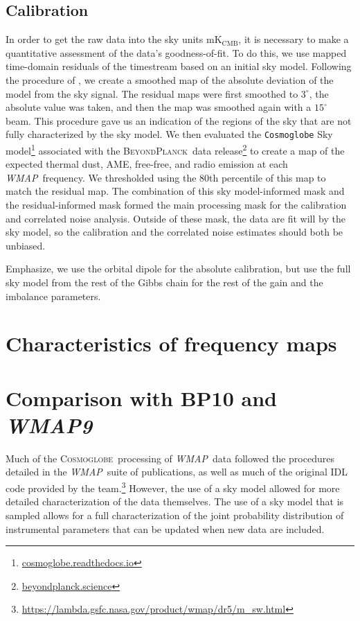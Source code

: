 \documentclass[twocolumn]{../../common/aa}
\def\WMAP{\emph{WMAP}}
\newcommand{\BP}{\textsc{BeyondPlanck}}
\newcommand{\Cosmoglobe}{\textsc{Cosmoglobe}}
\begin{document}

\subsection{Calibration}

In order to get the raw data into the sky units $\mathrm{mK_{CMB}}$, it is necessary to make a quantitative assessment of the data's goodness-of-fit. To do this, we use mapped time-domain residuals of the timestream based on an initial sky model. Following the procedure of \citet{bp06}, we create a smoothed map of the absolute deviation of the model from the sky signal. The residual maps were first smoothed to $3^\circ$, the absolute value was taken, and then the map was smoothed again with a $15^\circ$ beam. This procedure gave us an indication of the regions of the sky that are not fully characterized by the sky model. We then evaluated the \texttt{Cosmoglobe} Sky model\footnote{\url{cosmoglobe.readthedocs.io}} associated with the \BP\ data release\footnote{\url{beyondplanck.science}} to create a map of the expected thermal dust, AME, free-free, and radio emission at each \WMAP\ frequency. We thresholded using the 80th percentile of this map to match the residual map. The combination of this sky model-informed mask and the residual-informed mask formed the main processing mask for the calibration and correlated noise analysis.
Outside of these mask, the data are fit will by the sky model, so the calibration and the correlated noise estimates should both be unbiased.

Emphasize, we use the orbital dipole for the absolute calibration, but use the full sky model from the rest of the Gibbs chain for the rest of the gain and the imbalance parameters.


\section{Characteristics of frequency maps}
\label{sec:freqmaps}

\section{Comparison with BP10 and \textit{WMAP9}}
\label{sec:comparison}

Much of the \Cosmoglobe\ processing of \WMAP\ data followed the procedures detailed in the \WMAP\ suite of publications, as well as much of the original IDL code provided by the team.\footnote{\url{https://lambda.gsfc.nasa.gov/product/wmap/dr5/m_sw.html}} However, the use of a sky model allowed for more detailed characterization of the data themselves. The use of a sky model that is sampled allows for a full characterization of the joint probability distribution of instrumental parameters that can be updated when new data are included.
\end{document}
